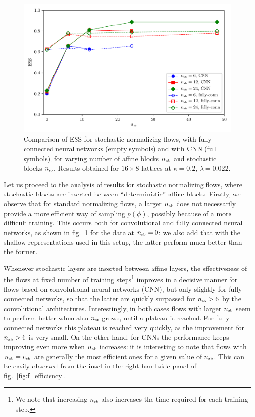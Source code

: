 \documentclass[11pt]{article}
\newcommand{\nab}{n_{\mbox{\tiny{ab}}}}
\newcommand{\nsb}{n_{\mbox{\tiny{sb}}}}
\begin{document}
\begin{figure}[!htb]
\begin{center}
\includegraphics*[width=\textwidth]{ESS_cnn_mlp.pdf}
\caption{Comparison of ESS for stochastic normalizing flows, with fully connected neural networks (empty symbols) and with CNN (full symbols), for varying number of affine blocks $\nab$ and stochastic blocks $\nsb$. Results obtained for $16\times8$ lattices at $\kappa=0.2$, $\lambda=0.022$.\label{fig:ESS_cnn_mlp}}
\end{center}
\end{figure}

Let us proceed to the analysis of results for stochastic normalizing flows, where stochastic blocks are inserted between ``deterministic'' affine blocks. Firstly, we observe that for standard normalizing flows, a larger $\nab$ does not necessarily provide a more efficient way of sampling $p(\phi)$, possibly because of a more difficult training. This occurs both for convolutional and fully connected neural networks, as shown in fig.~\ref{fig:ESS_cnn_mlp} for the data at $\nsb=0$: we also add that with the shallow representations used in this setup, the latter perform much better than the former. 

Whenever stochastic layers are inserted between affine layers, the effectiveness of the flows at fixed number of training steps\footnote{We note that increasing $\nsb$ also increases the time required for each training step.} improves in a decisive manner for flows based on convolutional neural networks (CNN), but only slightly for fully connected networks, so that the latter are quickly surpassed for $\nab>6$ by the convolutional architectures. Interestingly, in both cases flows with larger $\nab$ seem to perform better when also $\nsb$ grows, until a plateau is reached. For fully connected networks this plateau is reached very quickly, as the improvement for $\nab>6$ is very small. On the other hand, for CNNs the performance keeps improving even more when $\nab$ increases: it is interesting to note that flows with $\nab = \nsb$ are generally the most efficient ones for a given value of $\nab$. This can be easily observed from the inset in the right-hand-side panel of fig.~\ref{fig:f_efficiency}.
\end{document}
